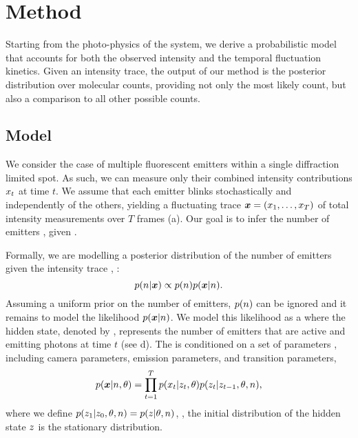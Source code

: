\section{Method}

Starting from the photo-physics of the system, we derive a probabilistic model
that accounts for both the observed intensity and the temporal fluctuation
kinetics.
  Given an intensity trace, the output of our method is the posterior
  distribution over molecular counts, providing not only the most likely count,
  but also a comparison to all other possible counts. 

\subsection{Model}

We consider the case of multiple fluorescent emitters within a single
diffraction limited spot.
%
  As such, we can measure only their combined intensity contributions
  $x_{t}$ at time $t$.
  We assume that each emitter blinks stochastically and independently of the
  others, yielding a fluctuating trace $\bm{x} = (x_{1},\ldots,x_{T})$ of total
  intensity measurements over $T$ frames (a).
  Our goal is to infer the number of emitters \n, given \trace.

Formally, we are modelling a posterior distribution of the
number of emitters \n given the intensity trace \trace, \ie:
  \begin{equation*}
    p(n | \bm{x}) \propto p(n) p(\bm{x} | n)
    \text{.}
  \end{equation*}
  Assuming a uniform prior on the number of emitters, $p(n)$ can be ignored
  and it remains to model the likelihood $p(\bm{x}|n)$.
  We model this likelihood as a \hmm where the hidden state, denoted by ,
  represents the number of emitters that are active and emitting photons at
  time $t$ (see d).
  The \hmm is conditioned on a set of parameters \parameters, including
    \parametersc camera parameters, \parameterse emission parameters, 
    and \parameterst transition parameters,
  \begin{equation}
    p(\bm{x}| n, \theta) =
      \prod_{t=1}^{T}
        p(x_{t} | z_{t}, \theta)
        p(z_{t} | z_{t-1}, \theta, n)
    \text{,}
    \label{eq:method:HMM}
  \end{equation}
  where we define $p(z_{1}|z_{0},\theta,n)=p(z_{}|\theta,n)$, \ie,
  the initial distribution of the hidden state $z_{}$ is the stationary
  distribution.

